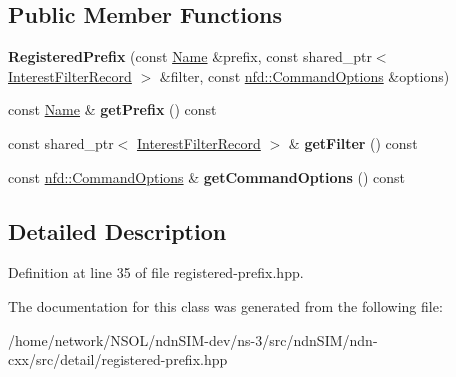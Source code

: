 \subsection*{Public Member Functions}
\begin{DoxyCompactItemize}
\item 
{\bfseries Registered\+Prefix} (const \hyperlink{classndn_1_1Name}{Name} \&prefix, const shared\+\_\+ptr$<$ \hyperlink{classndn_1_1InterestFilterRecord}{Interest\+Filter\+Record} $>$ \&filter, const \hyperlink{classndn_1_1nfd_1_1CommandOptions}{nfd\+::\+Command\+Options} \&options)\hypertarget{classndn_1_1RegisteredPrefix_a58bfe15c8a45a1d88d8a3c2ce473534c}{}\label{classndn_1_1RegisteredPrefix_a58bfe15c8a45a1d88d8a3c2ce473534c}

\item 
const \hyperlink{classndn_1_1Name}{Name} \& {\bfseries get\+Prefix} () const\hypertarget{classndn_1_1RegisteredPrefix_a301aa6c774bce73156757f54534f7d01}{}\label{classndn_1_1RegisteredPrefix_a301aa6c774bce73156757f54534f7d01}

\item 
const shared\+\_\+ptr$<$ \hyperlink{classndn_1_1InterestFilterRecord}{Interest\+Filter\+Record} $>$ \& {\bfseries get\+Filter} () const\hypertarget{classndn_1_1RegisteredPrefix_a259cbb9357827a5acaf9a82bb8d5f7e7}{}\label{classndn_1_1RegisteredPrefix_a259cbb9357827a5acaf9a82bb8d5f7e7}

\item 
const \hyperlink{classndn_1_1nfd_1_1CommandOptions}{nfd\+::\+Command\+Options} \& {\bfseries get\+Command\+Options} () const\hypertarget{classndn_1_1RegisteredPrefix_a283b33ed4ba5b581c4c11a007d22b6e3}{}\label{classndn_1_1RegisteredPrefix_a283b33ed4ba5b581c4c11a007d22b6e3}

\end{DoxyCompactItemize}


\subsection{Detailed Description}


Definition at line 35 of file registered-\/prefix.\+hpp.



The documentation for this class was generated from the following file\+:\begin{DoxyCompactItemize}
\item 
/home/network/\+N\+S\+O\+L/ndn\+S\+I\+M-\/dev/ns-\/3/src/ndn\+S\+I\+M/ndn-\/cxx/src/detail/registered-\/prefix.\+hpp\end{DoxyCompactItemize}
